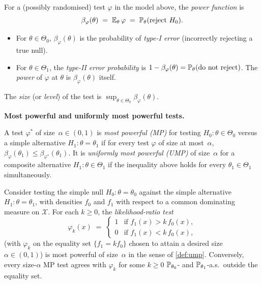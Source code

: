 \begin{definition}
\label{def:errors-power}
For a (possibly randomised) test $\varphi$ in the model above, the
\emph{power function} is
\[
  \beta_\varphi(\theta) \;=\; \mathbb{E}_\theta\, \varphi \;=\; \mathbb{P}_\theta(\text{reject } H_0).
\]
\begin{itemize}
  \item For $\theta \in \Theta_0$, $\beta_\varphi(\theta)$ is the
        probability of \emph{type-I error} (incorrectly rejecting
        a true null).
  \item For $\theta \in \Theta_1$, the
        \emph{type-II error probability} is
        $1 - \beta_\varphi(\theta) = \mathbb{P}_\theta(\text{do not reject})$.
        The \emph{power} of $\varphi$ at $\theta$ is
        $\beta_\varphi(\theta)$ itself.
\end{itemize}
The \emph{size} (or \emph{level}) of the test is
$\sup_{\theta \in \Theta_0} \beta_\varphi(\theta)$.
\end{definition}

\medskip
\noindent\textbf{Most powerful and uniformly most powerful tests.}

\begin{definition}
\label{def:ump}
A test $\varphi^*$ of size~$\alpha \in (0, 1)$ is
\emph{most powerful (MP)} for testing $H_0 : \theta \in \Theta_0$
versus a simple alternative $H_1 : \theta = \theta_1$ if for every
test $\varphi$ of size at most~$\alpha$,
$\beta_\varphi(\theta_1) \leq \beta_{\varphi^*}(\theta_1)$. It is
\emph{uniformly most powerful (UMP)} of size~$\alpha$ for a composite
alternative $H_1 : \theta \in \Theta_1$ if the inequality above
holds for every $\theta_1 \in \Theta_1$ simultaneously.
\end{definition}

\begin{theorem}
\label{thm:neyman-pearson}
Consider testing the simple null $H_0 : \theta = \theta_0$ against
the simple alternative $H_1 : \theta = \theta_1$, with densities
$f_0$ and $f_1$ with respect to a common dominating measure on
$\mathcal{X}$. For each $k \geq 0$, the \emph{likelihood-ratio
test}
\[
  \varphi_k(x) \;=\; \begin{cases}
    1 & \text{if } f_1(x) > k\, f_0(x), \\
    0 & \text{if } f_1(x) < k\, f_0(x),
  \end{cases}
\]
(with $\varphi_k$ on the equality set $\{f_1 = k f_0\}$ chosen to
attain a desired size~$\alpha \in (0, 1)$) is most powerful of
size~$\alpha$ in the sense of \cref{def:ump}. Conversely, every
size-$\alpha$ MP test agrees with $\varphi_k$ for some $k \geq 0$
$\mathbb{P}_{\theta_0}$- and $\mathbb{P}_{\theta_1}$-a.s.\ outside the
equality set.
\end{theorem}

